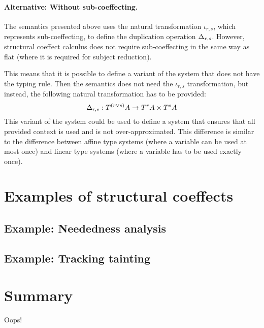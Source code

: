\paragraph{Alternative: Without sub-coeffecting.} The semantics presented above uses the natural
transformation $\iota_{r, s}$, which represents sub-coeffecting, to define the duplication
operation $\Delta_{r, s}$. However, structural coeffect calculus \clstr does not require 
sub-coeffecting in the same way as flat \clflt (where it is required for subject reduction).

This means that it is possible to define a variant of the system that does not have the  
typing rule. Then the semantics does not need the $\iota_{r, s}$ transformation, but instead,
the following natural transformation has to be provided:
%
\begin{equation*}
\Delta_{r, s} : T^{(r \vee s)}A \rightarrow T^r A \times T^s A
\end{equation*}
%
This variant of the system could be used to define a system that ensures that all provided 
context is used and is not over-approximated. This difference is similar to the difference between
affine type systems (where a variable can be used at most once) and linear type systems 
(where a variable has to be used exactly once).


\section{Examples of structural coeffects}

\subsection{Example: Neededness analysis}
\label{sec:structural-neededness}

\subsection{Example: Tracking tainting}
\label{sec:structural-tainting}

\section{Summary}
Oops!
